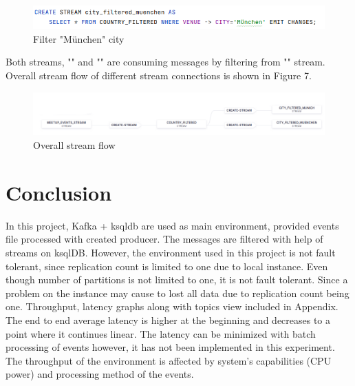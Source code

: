 \documentclass[sigplan,screen]{acmart}
\begin{document}
\begin{figure}[H]
    \centerline{\includegraphics[scale=.3]{assets/filter_munchen_stream.png}}
    \caption{Filter "München" city }
    \label{fig}
\end{figure}

Both streams, "" and "" are consuming messages by filtering from "" stream. Overall stream flow of different stream connections is shown in Figure 7. 

\begin{figure}[H]
    \centerline{\includegraphics[scale=.2]{assets/stream_flow.png}}
    \caption{Overall stream flow  }
    \label{fig}
\end{figure}



\section{Conclusion}
In this project, Kafka + ksqldb are used as main environment, provided events file processed with created producer. The messages are filtered with help of streams on ksqlDB. However, the environment used in this project is not fault tolerant, since replication count is limited to one due to local instance. Even though number of partitions is not limited to one, it is not fault tolerant. Since a problem on the instance may cause to lost all data due to replication count being one. Throughput, latency graphs along with topics view included in Appendix. The end to end average latency is higher at the beginning and decreases to a point where it continues linear. The latency can be minimized with batch processing of events however, it has not been implemented in this experiment. The throughput of the environment is affected by system's capabilities (CPU power) and processing method of the events. 





\end{document}
